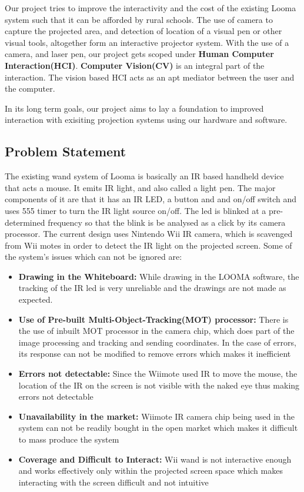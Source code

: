\documentclass[12pt, a4paper]{article}
\begin{document}
Our project tries to improve the interactivity and the cost of the existing Looma system such that it can be afforded by rural schools. The use of camera to capture the projected area, and detection of location of a visual pen or other visual tools, altogether form an interactive projector system. With the use of a camera, and laser pen, our project gets scoped under \textbf{Human Computer Interaction(HCI)}. \textbf{Computer Vision(CV)} is an integral part of the interaction. The vision based HCI acts as an apt mediator between the user and the computer.

In its long term goals, our project aims to lay a foundation to improved interaction with exisiting projection systems using our hardware and software. 

\subsection{Problem Statement}
The existing wand system of Looma is basically an IR based handheld device that acts a mouse. It emits IR light, and also called a light pen. The major components of it are that it has an IR LED, a button and and on/off switch and uses 555 timer to turn the IR light source on/off. The led is blinked at a pre-determined frequency so that the blink is be analysed as a click by its camera processor. The current design uses Nintendo Wii IR camera, which is scavenged from Wii motes in order to detect the IR light on the projected screen. Some of the system's issues which can not be ignored are:

\begin{itemize}
\item \textbf {Drawing in the Whiteboard:} While drawing in the LOOMA software, the tracking of the IR led is very unreliable and the drawings are not made as expected.
\item \textbf{Use of Pre-built Multi-Object-Tracking(MOT) processor:} There is the use of inbuilt MOT processor in the camera chip, which does part of the image processing and tracking and sending coordinates. In the case of errors, its response can not be modified to remove errors which makes it inefficient
\item \textbf{Errors not detectable:} Since the Wiimote used IR to move the mouse, the location of the IR on the screen is not visible with the naked eye thus making errors not detectable 
\item \textbf{Unavailability in the market:} Wiimote IR camera chip being used in the system can not be readily bought in the open market which makes it difficult to mass produce the system
\item \textbf{Coverage and Difficult to Interact:} Wii wand is not interactive enough and works effectively only within the projected screen space which makes interacting with the screen difficult and not intuitive
\end{itemize}
\end{document}
